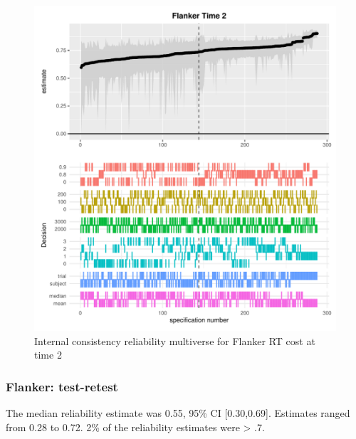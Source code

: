 \documentclass[english,man,floatsintext]{apa6}
\begin{document}
\begin{figure}
\centering
\includegraphics{Reliability_Multiverse_files/figure-latex/unnamed-chunk-9-1.pdf}
\caption{\label{fig:unnamed-chunk-9}Internal consistency reliability multiverse for Flanker RT cost at time 2}
\end{figure}

\newpage

\hypertarget{flanker-test-retest}{%
\subsubsection{Flanker: test-retest}\label{flanker-test-retest}}

The median reliability estimate was 0.55, 95\% CI {[}0.30,0.69{]}. Estimates ranged from 0.28 to 0.72. 2\% of the reliability estimates were \textgreater{} .7.
\end{document}
